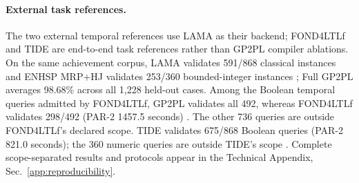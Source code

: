 \paragraph{External task references.}
The two external temporal references use LAMA as their backend; FOND4LTLf
and TIDE are end-to-end task references rather than GP2PL compiler ablations.
On the same achievement corpus, LAMA validates
591/868 classical instances and
ENHSP MRP+HJ validates
253/360 bounded-integer instances
\cite{RichterWestphal2010LAMA,Scala2020NumericSubgoaling}; Full GP2PL averages
98.68\% across all 1,228 held-out cases. Among the
Boolean temporal queries admitted by FOND4LTLf, GP2PL validates all
492, whereas FOND4LTLf validates
298/492 (PAR-2 1457.5 seconds) \cite{DeGiacomoFuggitti2021FOND4LTLf}.
The other 736 queries are outside FOND4LTLf's declared
scope. TIDE validates
675/868 Boolean queries (PAR-2 821.0 seconds); the 360
numeric queries are outside TIDE's scope \cite{Suprun2026TIDE}. Complete
scope-separated results and protocols appear in the Technical Appendix,
Sec.~\ref{app:reproducibility}.
